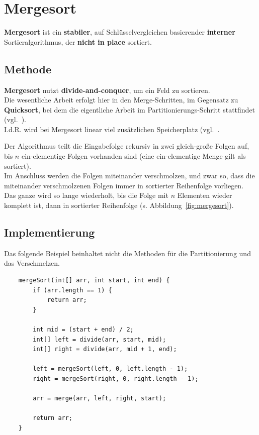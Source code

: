 \section{Mergesort}

\textbf{Mergesort} ist ein \textbf{stabiler}, auf Schlüsselvergleichen basierender \textbf{interner} Sortieralgorithmus, der \textbf{nicht in place} sortiert.

\subsection{Methode}

\textbf{Mergesort} nutzt \textbf{divide-and-conquer}, um ein Feld zu sortieren.\\
Die wesentliche Arbeit erfolgt hier in den Merge-Schritten, im Gegensatz zu \textbf{Quicksort}, bei dem die eigentliche Arbeit im Partitionierungs-Schritt stattfindet (vgl.~\cite[174]{GD18e}).\\
I.d.R. wird bei Mergesort linear viel zusätzlichen Speicherplatz (vgl.~\cite[112]{OW17b}.

\noindent
Der Algorithmus teilt die Eingabefolge rekursiv in zwei gleich-große Folgen auf, bis $n$ ein-elementige Folgen vorhanden sind (eine ein-elementige Menge gilt als sortiert).\\
Im Anschluss werden die Folgen miteinander verschmolzen, und zwar so, dass die miteinander verschmolzenen Folgen immer in sortierter Reihenfolge vorliegen.\\
Das ganze wird so lange wiederholt, bis die Folge mit $n$ Elementen wieder komplett ist, dann in sortierter Reihenfolge (s. Abbildung~\ref{fig:mergesort}).\\


\subsection{Implementierung}

Das folgende Beispiel beinhaltet nicht die Methoden für die Partitionierung und das Verschmelzen.

\begin{verbatim}
    mergeSort(int[] arr, int start, int end) {
        if (arr.length == 1) {
            return arr;
        }

        int mid = (start + end) / 2;
        int[] left = divide(arr, start, mid);
        int[] right = divide(arr, mid + 1, end);

        left = mergeSort(left, 0, left.length - 1);
        right = mergeSort(right, 0, right.length - 1);

        arr = merge(arr, left, right, start);

        return arr;
    }

\end{verbatim}

